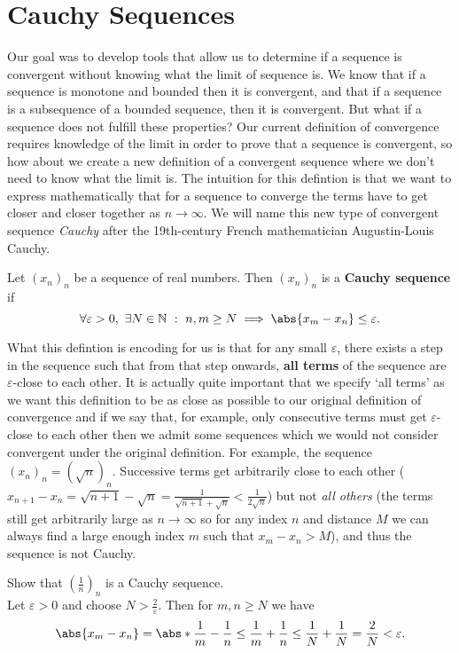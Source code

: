 \documentclass[../real_analysis.tex]{subfiles}
\begin{document}
    \section{Cauchy Sequences}\label{sec:cauchy-sequences}
        Our goal was to develop tools that allow us to determine if a sequence is convergent without knowing what the limit of sequence is. We know that if a sequence is monotone and bounded then it is convergent, and that if a sequence is  a subsequence of a bounded sequence, then it is convergent. But what if a sequence does not fulfill these properties? Our current definition of convergence requires knowledge of the limit in order to prove that a sequence is convergent, so how about we create a new definition of a convergent sequence where we don't need to know what the limit is. The intuition for this defintion is that we want to express mathematically that for a sequence to converge the terms have to get closer and closer together as $n\to\infty$. We will name this new type of convergent sequence \textit{Cauchy} after the 19th-century French mathematician Augustin-Louis Cauchy.
        \begin{definition}
            Let $(x_n)_n$ be a sequence of real numbers. Then $(x_n)_n$ is a \textbf{Cauchy sequence} if
            \begin{equation}
                \forall\varepsilon>0,\ \exists N\in\mathbb{N}\ :\ n,m\geq N\implies\abs{x_m-x_n}\leq\varepsilon.
            \end{equation}
        \end{definition}
        What this defintion is encoding for us is that for any small $\varepsilon$, there exists a step in the sequence such that from that step onwards, \textbf{all terms} of the sequence are $\varepsilon$-close to each other. It is actually quite important that we specify `all terms' as we want this definition to be as close as possible to our original definition of convergence and if we say that, for example, only consecutive terms must get $\varepsilon$-close to each other then we admit some sequences which we would not consider convergent under the original definition. For example, the sequence $(x_n)_n=(\sqrt{n})_n$. Successive terms get arbitrarily close to each other ($x_{n+1}-x_n=\sqrt{n+1}-\sqrt{n}=\frac{1}{\sqrt{n+1}+\sqrt{n}}<\frac{1}{2\sqrt{n}}$) but not \textit{all others} (the terms still get arbitrarily large as $n\to\infty$ so for any index $n$ and distance $M$ we can always find a large enough index $m$ such that $x_m-x_n>M$), and thus the sequence is not Cauchy.
        \begin{example}
            Show that $\left(\frac{1}{n}\right)_n$ is a Cauchy sequence.\\
            Let $\varepsilon>0$ and choose $N>\frac{2}{\varepsilon}$. Then for $m,n\geq N$ we have
            \begin{equation}
                \abs{x_m-x_n}=\abs*{\frac{1}{m}-\frac{1}{n}}\leq\frac{1}{m}+\frac{1}{n}\leq\frac{1}{N}+\frac{1}{N}=\frac{2}{N}<\varepsilon.
            \end{equation}
        \end{example}
\end{document}
